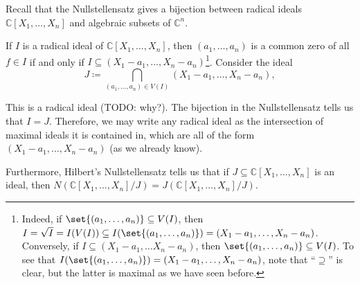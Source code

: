Recall that the Nullstellensatz gives a bijection between
radical ideals $\mathbb{C}[X_1, \ldots, X_n]$ and algebraic subsets of
$\mathbb{C}^n$.

If $I$ is a radical ideal of $\mathbb{C}[X_1, \ldots, X_n]$, then
$(a_1, \ldots, a_n)$ is a common zero of all $f \in I$ if and only if
$I \subseteq (X_1 - a_1, \ldots, X_n-a_n)$\footnote{Indeed, if
$\set{(a_1, \ldots, a_n)} \subseteq V(I)$, then
$I = \sqrt{I} = I(V(I)) \subseteq I(\set{(a_1, \ldots, a_n)}) =
(X_1 - a_1,\ldots, X_n-a_n)$. Conversely, if $I \subseteq (X_1 - a_1, \ldots
X_n - a_n)$, then $\set{(a_1, \ldots, a_n)} \subseteq V(I)$. To see that
$I(\set{(a_1, \ldots, a_n)}) = (X_1 - a_1, \ldots, X_n - a_n)$, note that
\enquote{$\supseteq$} is clear, but the latter is maximal as we have seen
before.}. Consider the ideal
\[J\coloneqq \bigcap_{(a_1, \ldots, a_n) \in V(I)} (X_1-a_1, \ldots, X_n-a_n), \]

This is a radical ideal (TODO: why?). The bijection in the Nullstellensatz
tells us that $I=J$. Therefore, we may write any radical ideal as the
intersection of maximal ideals it is contained in, which are all of the form
$(X_1-a_1, \ldots, X_n-a_n)$ (as we already know).

Furthermore, Hilbert's Nullstellensatz tells us that if $J \subseteq \mathbb{C}[X_1, \ldots, X_n]$ is an ideal, then $N(\mathbb{C}[X_1, \ldots, X_n]/J) = J(\mathbb{C}[X_1, \ldots, X_n]/J)$.
